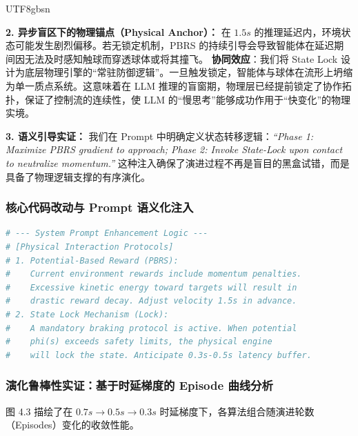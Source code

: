 \documentclass[11pt,a4paper]{article}
\begin{document}
\begin{CJK*}{UTF8}{gbsn}
\begin{tcolorbox}[enhanced, colback=blue!5!white, colframe=SDUBlue, arc=2mm, title=\textbf{PBRS 与 State Lock 的协同逻辑与延迟补偿}]
\textbf{2. 异步盲区下的物理锚点（Physical Anchor）：}
在 $1.5s$ 的推理延迟内，环境状态可能发生剧烈偏移。若无锁定机制，PBRS 的持续引导会导致智能体在延迟期间因无法及时感知触球而穿透球体或将其撞飞。
\textbf{协同效应}：我们将 State Lock 设计为底层物理引擎的“常驻防御逻辑”。一旦触发锁定，智能体与球体在流形上坍缩为单一质点系统。这意味着在 LLM 推理的盲窗期，物理层已经提前锁定了协作拓扑，保证了控制流的连续性，使 LLM 的“慢思考”能够成功作用于“快变化”的物理实境。

\textbf{3. 语义引导实证：}
我们在 Prompt 中明确定义状态转移逻辑：\textit{“Phase 1: Maximize PBRS gradient to approach; Phase 2: Invoke State-Lock upon contact to neutralize momentum.”} 这种注入确保了演进过程不再是盲目的黑盒试错，而是具备了物理逻辑支撑的有序演化。
\end{tcolorbox}
\subsubsection{核心代码改动与 Prompt 语义化注入}
\begin{lstlisting}[language=Python, caption={PBRS与State Lock的语义注入实现}]
# --- System Prompt Enhancement Logic ---
# [Physical Interaction Protocols]
# 1. Potential-Based Reward (PBRS): 
#    Current environment rewards include momentum penalties. 
#    Excessive kinetic energy toward targets will result in 
#    drastic reward decay. Adjust velocity 1.5s in advance.
# 2. State Lock Mechanism (Lock): 
#    A mandatory braking protocol is active. When potential 
#    phi(s) exceeds safety limits, the physical engine 
#    will lock the state. Anticipate 0.3s-0.5s latency buffer.
\end{lstlisting}

\subsubsection{演化鲁棒性实证：基于时延梯度的 Episode 曲线分析}
图 4.3 描绘了在 $0.7s \rightarrow 0.5s \rightarrow 0.3s$ 时延梯度下，各算法组合随演进轮数（Episodes）变化的收敛性能。

\begin{figure}[h!]
\centering
{}
\end{figure}
\end{CJK*}
\end{document}
